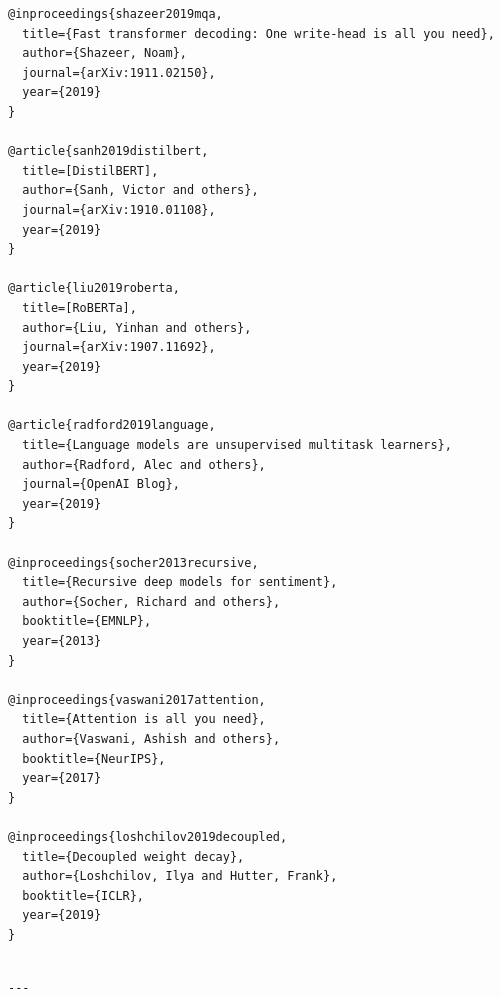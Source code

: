 \begin{lstlisting}
@inproceedings{shazeer2019mqa,
  title={Fast transformer decoding: One write-head is all you need},
  author={Shazeer, Noam},
  journal={arXiv:1911.02150},
  year={2019}
}

@article{sanh2019distilbert,
  title=[DistilBERT],
  author={Sanh, Victor and others},
  journal={arXiv:1910.01108},
  year={2019}
}

@article{liu2019roberta,
  title=[RoBERTa],
  author={Liu, Yinhan and others},
  journal={arXiv:1907.11692},
  year={2019}
}

@article{radford2019language,
  title={Language models are unsupervised multitask learners},
  author={Radford, Alec and others},
  journal={OpenAI Blog},
  year={2019}
}

@inproceedings{socher2013recursive,
  title={Recursive deep models for sentiment},
  author={Socher, Richard and others},
  booktitle={EMNLP},
  year={2013}
}

@inproceedings{vaswani2017attention,
  title={Attention is all you need},
  author={Vaswani, Ashish and others},
  booktitle={NeurIPS},
  year={2017}
}

@inproceedings{loshchilov2019decoupled,
  title={Decoupled weight decay},
  author={Loshchilov, Ilya and Hutter, Frank},
  booktitle={ICLR},
  year={2019}
}
\end{lstlisting}
\begin{lstlisting}

---
\end{lstlisting}